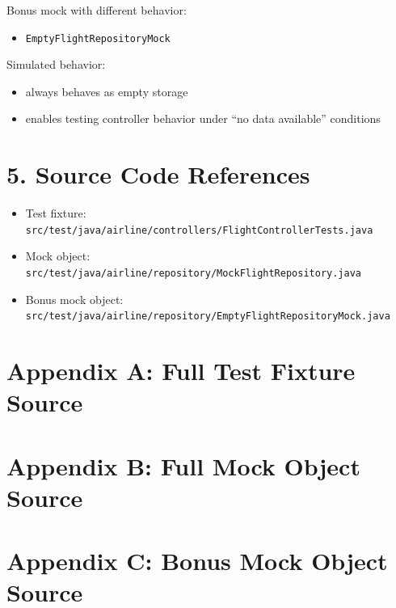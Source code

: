 \documentclass[11pt,a4paper]{article}
\begin{document}
Bonus mock with different behavior:
\begin{itemize}
    \item \texttt{EmptyFlightRepositoryMock}
\end{itemize}

Simulated behavior:
\begin{itemize}
    \item always behaves as empty storage
    \item enables testing controller behavior under ``no data available'' conditions
\end{itemize}

\section*{5. Source Code References}
\begin{itemize}
    \item Test fixture: \texttt{src/test/java/airline/controllers/FlightControllerTests.java}
    \item Mock object: \texttt{src/test/java/airline/repository/MockFlightRepository.java}
    \item Bonus mock object: \texttt{src/test/java/airline/repository/EmptyFlightRepositoryMock.java}
\end{itemize}

\newpage
\section*{Appendix A: Full Test Fixture Source}


\newpage
\section*{Appendix B: Full Mock Object Source}


\newpage
\section*{Appendix C: Bonus Mock Object Source}

\end{document}
